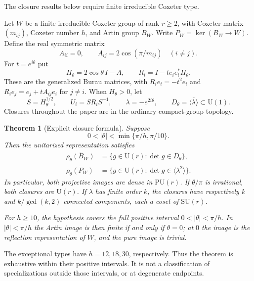 \documentclass[11pt,a4paper]{article}
\newtheorem{theorem}{Theorem}[section]
\theoremstyle{remark}\newtheorem{remark}[theorem]{Remark}
\newcommand{\U}{\mathrm U}
\newcommand{\SU}{\mathrm {SU}}
\newcommand{\PU}{\mathrm {PU}}
\begin{document}
The closure results below require finite irreducible Coxeter type.

Let $W$ be a finite irreducible Coxeter group of rank $r\geq2$, with
Coxeter matrix $(m_{ij})$, Coxeter number $h$, and Artin group $B_W$.
Write $P_W=\ker(B_W\to W)$.  Define the real symmetric matrix
\begin{equation}\label{eq:A}
 A_{ii}=0,\qquad A_{ij}=2\cos(\pi/m_{ij})\quad(i\ne j).
\end{equation}
For $t=e^{i\theta}$ put
\begin{equation}\label{eq:H}
 H_\theta=2\cos\theta\,I-A,
 \qquad R_i=I-t e_i e_i^*H_\theta.
\end{equation}
These are the generalized Burau matrices, with
$R_ie_i=-t^2e_i$ and $R_ie_j=e_j+tA_{ij}e_i$ for $j\ne i$.
When $H_\theta>0$, let
\begin{equation}\label{eq:U}
 S=H_\theta^{1/2},\qquad U_i=SR_iS^{-1},\qquad
 \lambda=-e^{2i\theta},\qquad D_\theta=\overline{\langle\lambda\rangle}
 \subset\U(1).
\end{equation}
Closures throughout the paper are in the ordinary compact-group topology.

\begin{theorem}[Explicit closure formula]\label{thm:main}
Suppose
\begin{equation}\label{eq:range}
 0<|\theta|<\min\{\pi/h,\pi/10\}.
\end{equation}
Then the unitarized representation satisfies
\begin{align}
 \overline{\rho_\theta(B_W)}
 &=\{g\in\U(r):\det g\in D_\theta\},\label{eq:closure}\\
 \overline{\rho_\theta(P_W)}
 &=\{g\in\U(r):\det g\in
            \overline{\langle\lambda^2\rangle}\}.\label{eq:pureclosure}
\end{align}
In particular, both projective images are dense in $\PU(r)$.
If $\theta/\pi$ is irrational, both closures are $\U(r)$.
If $\lambda$ has finite order $k$, the closures have respectively
$k$ and $k/\gcd(k,2)$ connected components, each a coset of $\SU(r)$.

For $h\geq10$, the hypothesis covers the full positive interval
$0<|\theta|<\pi/h$.  In $|\theta|<\pi/h$ the Artin image is then finite
if and only if $\theta=0$; at $0$ the image is the reflection representation
of $W$, and the pure image is trivial.
\end{theorem}

The exceptional types have $h=12,18,30$, respectively.  Thus the theorem
is exhaustive within their positive intervals.  It is not a classification
of specializations outside those intervals, or at degenerate endpoints.
\end{document}
